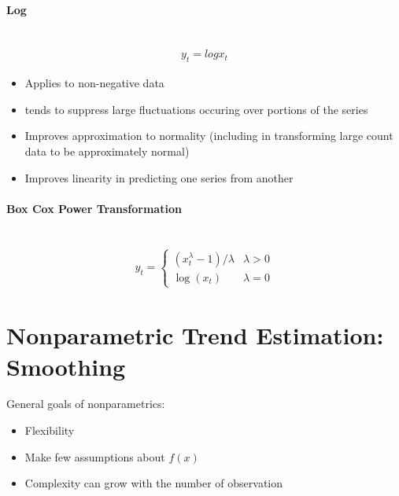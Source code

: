 \paragraph{Log} \mbox{}\\
    \begin{align*}
        y_t = log x_t
    \end{align*}
    \begin{itemize}
        \item Applies to non-negative data
        \item tends to suppress large fluctuations occuring over portions of the series 
        \item Improves approximation to normality (including in transforming large count data to be approximately normal) 
        \item Improves linearity in predicting one series from another 
    \end{itemize}

\paragraph{Box Cox Power Transformation} \mbox{} \\
    \begin{align*}
        y_t = 
            \begin{cases} 
            (x_t^\lambda - 1) / \lambda & \lambda > 0 \\
            \log (x_t) & \lambda = 0
            \end{cases}
    \end{align*}
    
    
\section{Nonparametric Trend Estimation: Smoothing} 
General goals of nonparametrics: 
    \begin{itemize}
        \item Flexibility
        \item Make few assumptions about $f(x)$
        \item Complexity can grow with the number of observation 
    \end{itemize}
    
